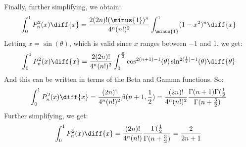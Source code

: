 \documentclass[crop=false,class=book,oneside]{standalone}
\begin{document}
        Finally, further simplifying, we obtain:
        \begin{equation}
            \int_{0}^{1}P_{n}^{2}(x)\diff{x}=
                \frac{2(2n)!(\minus{1})^{n}}{4^{n}(n!)^{2}}
                \int_{\minus{1}}^{1}(1-x^{2})^{n}\diff{x}
        \end{equation}
        Letting $x=\sin(\theta)$, which is valid since
        $x$ ranges between $\minus{1}$ and $1$, we get:
        \begin{equation}
            \int_{0}^{1}P_{n}^{2}(x)\diff{x}=
            \frac{2(2n)!}{4^{n}(n!)^{2}}\int_{0}^{\frac{\pi}{2}}
                \cos^{2(n+1)-1}(\theta)
                \sin^{2(\frac{1}{2})-1}(\theta)\diff{\theta}
        \end{equation}
        And this can be written in terms of the Beta and Gamma
        functions. So:
        \begin{equation}
            \int_{0}^{1}P_{n}^{2}(x)\diff{x}=
            \frac{(2n)!}{4^{n}(n!)^{2}}\beta(n+1,\frac{1}{2})=
            \frac{(2n)!}{4^{n}(n!)^{2}}
            \frac{\Gamma(n+1)\Gamma(\frac{1}{2}}
                {\Gamma(n+\frac{3}{2})}
        \end{equation}
        Further simplifying, we get:
        \begin{equation}
            \int_{0}^{1}P_{n}^{2}(x)\diff{x}=
            \frac{(2n)!}{4^{n}(n!)}
            \frac{\Gamma(\frac{1}{2}}{\Gamma(n+\frac{3}{2})}
            =\frac{2}{2n+1}
        \end{equation}
\end{document}

